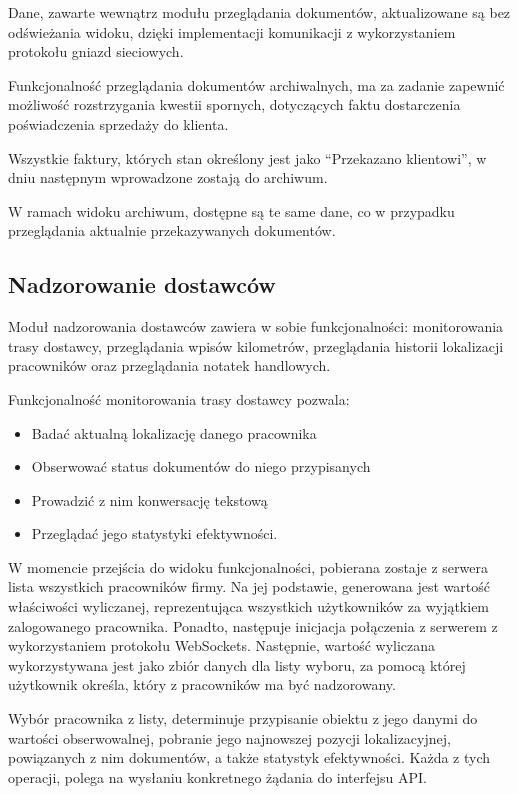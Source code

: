 Dane, zawarte wewnątrz modułu przeglądania dokumentów, aktualizowane są bez odświeżania widoku, dzięki implementacji komunikacji z wykorzystaniem protokołu gniazd sieciowych.

Funkcjonalność przeglądania dokumentów archiwalnych, ma za zadanie zapewnić możliwość rozstrzygania kwestii spornych, dotyczących faktu dostarczenia poświadczenia sprzedaży do klienta.

Wszystkie faktury, których stan określony jest jako "`Przekazano klientowi"', w dniu następnym wprowadzone zostają do archiwum.

W ramach widoku archiwum, dostępne są te same dane, co w przypadku przeglądania aktualnie przekazywanych dokumentów.

\subsection{Nadzorowanie dostawców}
Moduł nadzorowania dostawców zawiera w sobie funkcjonalności: monitorowania trasy dostawcy, przeglądania wpisów kilometrów, przeglądania historii lokalizacji pracowników oraz przeglądania notatek handlowych.

Funkcjonalność monitorowania trasy dostawcy pozwala:
\begin{itemize}
	\item Badać aktualną lokalizację danego pracownika
	\item Obserwować status dokumentów do niego przypisanych
	\item Prowadzić z nim konwersację tekstową
	\item Przeglądać jego statystyki efektywności.
\end{itemize}

W momencie przejścia do widoku funkcjonalności, pobierana zostaje z serwera lista wszystkich pracowników firmy. Na jej podstawie, generowana jest wartość właściwości wyliczanej, reprezentująca wszystkich użytkowników za wyjątkiem zalogowanego pracownika. Ponadto, następuje inicjacja połączenia z serwerem z wykorzystaniem protokołu WebSockets. Następnie, wartość wyliczana wykorzystywana jest jako zbiór danych dla listy wyboru, za pomocą której użytkownik określa, który z pracowników ma być nadzorowany.

Wybór pracownika z listy, determinuje przypisanie obiektu z jego danymi do wartości obserwowalnej, pobranie jego najnowszej pozycji lokalizacyjnej, powiązanych z nim dokumentów, a także statystyk efektywności. Każda z tych operacji, polega na wysłaniu konkretnego żądania do interfejsu API.

